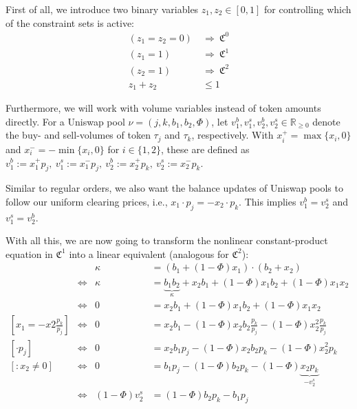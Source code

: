 \documentclass[11pt,parskip=full]{scrartcl}%
\newcommand*{\ie}{i.e., }
\newcommand*{\token}{\tau}                  %
\newcommand*{\uniswap}{\nu}                 %
\begin{document}
First of all, we introduce two binary variables $z_1, z_2 \in [0,1]$ for controlling which of the constraint sets is active:
\begin{align*}
  (z_1 = z_2 = 0) \ &\Rightarrow \ \mathfrak{C}^0\\
  (z_1 = 1) \ &\Rightarrow \ \mathfrak{C}^1\\
  (z_2 = 1) \ &\Rightarrow \ \mathfrak{C}^2\\[1mm]
  z_1 + z_2 &\le 1
\end{align*}

Furthermore, we will work with volume variables instead of token amounts directly.
For a Uniswap pool $\uniswap = (j,k,b_1,b_2,\Phi)$, let $v_1^b, v_1^s, v_2^b, v_2^s \in \mathbb{R}_{\ge 0}$ denote the buy- and sell-volumes of token $\token_j$ and $\token_k$, respectively.
With $x_i^+ = \max\{x_i,0\}$ and $x_i^- = -\min\{x_i,0\}$ for $i \in \{1,2\}$, these are defined as $v_1^b := x_1^+ p_j,\> v_1^s := x_1^- p_j,\> v_2^b := x_2^+ p_k,\> v_2^s := x_2^- p_k$.

Similar to regular orders, we also want the balance updates of Uniswap pools to follow our uniform clearing prices, \ie $x_1 \cdot p_j = -x_2 \cdot p_k$.
This implies $v_1^b = v_2^s$ and $v_1^s = v_2^b$.

With all this, we are now going to transform the nonlinear constant-product equation in $\mathfrak{C}^1$ into a linear equivalent (analogous for $\mathfrak{C}^2$):
\begin{align*}
  && \kappa &= (b_1 + (1-\Phi) x_1) \cdot (b_2 + x_2) \\[1mm]
  &\Leftrightarrow&
  \kappa &= \underbrace{b_1 b_2}_{\kappa} + x_2 b_1 + (1-\Phi) x_1 b_2 + (1-\Phi) x_1 x_2 \\
  &\Leftrightarrow&
  0 &= x_2 b_1 + (1-\Phi) x_1 b_2 + (1-\Phi) x_1 x_2 \\[1mm]
  \left[x_1 = -x2 \frac{p_k}{p_j}\right] &\Leftrightarrow&
  0 &= x_2 b_1 - (1-\Phi) x_2 b_2 \frac{p_k}{p_j} - (1-\Phi) x_2^2 \frac{p_k}{p_j} \\[1mm]
  \left[\cdot p_j\right]&\Leftrightarrow&
  0 &= x_2 b_1 p_j - (1-\Phi) x_2 b_2 p_k - (1-\Phi) x_2^2 p_k \\[1mm]
  \left[\colon x_2 \neq 0\right]&\Leftrightarrow&
  0 &= b_1 p_j -(1-\Phi) b_2 p_k - (1-\Phi) \underbrace{x_2 p_k}_{-v_2^s} \\[1mm]
  &\Leftrightarrow&
  (1-\Phi) v_2^s &= (1-\Phi) b_2 p_k - b_1 p_j
\end{align*}
\end{document}
